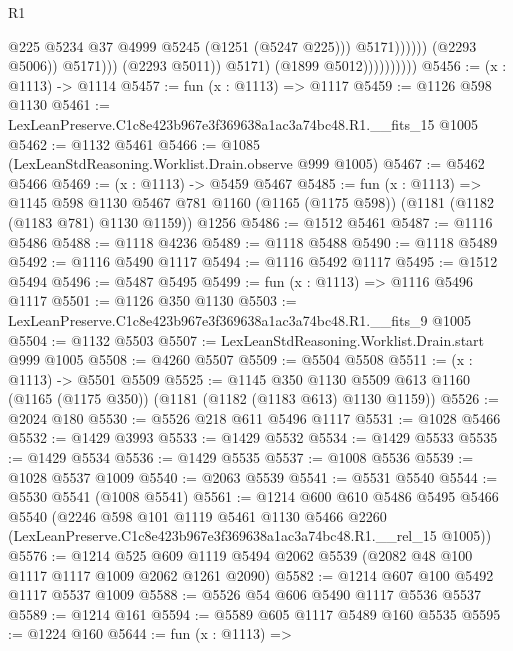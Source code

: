 \begin{lexlean}{R1}
\begin{coremodule}
                                                @225
                                                @5234
                                                @37
                                                @4999
                                                @5245
                                                (@1251 (@5247 @225)))
                                              @5171))))))
                                  (@2293 @5006))
                                @5171)))
                          (@2293 @5011))
                        @5171)
                      (@1899 @5012))))))))))
@5456 := (x : @1113) -> @1114
@5457 := fun (x : @1113) => @1117
@5459 := @1126 @598 @1130
@5461 := LexLeanPreserve.C1c8e423b967e3f369638a1ac3a74bc48.R1.__fits_15 @1005
@5462 := @1132 @5461
@5466 := @1085 (LexLeanStdReasoning.Worklist.Drain.observe @999 @1005)
@5467 := @5462 @5466
@5469 := (x : @1113) -> @5459 @5467
@5485 := fun (x : @1113) =>
  @1145
    @598
    @1130
    @5467
    @781
    @1160
    (@1165 (@1175 @598))
    (@1181 (@1182 (@1183 @781) @1130 @1159))
    @1256
@5486 := @1512 @5461
@5487 := @1116 @5486
@5488 := @1118 @4236
@5489 := @1118 @5488
@5490 := @1118 @5489
@5492 := @1116 @5490 @1117
@5494 := @1116 @5492 @1117
@5495 := @1512 @5494
@5496 := @5487 @5495
@5499 := fun (x : @1113) => @1116 @5496 @1117
@5501 := @1126 @350 @1130
@5503 := LexLeanPreserve.C1c8e423b967e3f369638a1ac3a74bc48.R1.__fits_9 @1005
@5504 := @1132 @5503
@5507 := LexLeanStdReasoning.Worklist.Drain.start @999 @1005
@5508 := @4260 @5507
@5509 := @5504 @5508
@5511 := (x : @1113) -> @5501 @5509
@5525 := @1145
    @350
    @1130
    @5509
    @613
    @1160
    (@1165 (@1175 @350))
    (@1181 (@1182 (@1183 @613) @1130 @1159))
@5526 := @2024 @180
@5530 := @5526 @218 @611 @5496 @1117
@5531 := @1028 @5466
@5532 := @1429 @3993
@5533 := @1429 @5532
@5534 := @1429 @5533
@5535 := @1429 @5534
@5536 := @1429 @5535
@5537 := @1008 @5536
@5539 := @1028 @5537 @1009
@5540 := @2063 @5539
@5541 := @5531 @5540
@5544 := @5530 @5541 (@1008 @5541)
@5561 := @1214
    @600
    @610
    @5486
    @5495
    @5466
    @5540
    (@2246
      @598
      @101
      @1119
      @5461
      @1130
      @5466
      @2260
      (LexLeanPreserve.C1c8e423b967e3f369638a1ac3a74bc48.R1.__rel_15 @1005))
@5576 := @1214
    @525
    @609
    @1119
    @5494
    @2062
    @5539
    (@2082 @48 @100 @1117 @1117 @1009 @2062 @1261 @2090)
@5582 := @1214 @607 @100 @5492 @1117 @5537 @1009
@5588 := @5526 @54 @606 @5490 @1117 @5536 @5537
@5589 := @1214 @161
@5594 := @5589 @605 @1117 @5489 @160 @5535
@5595 := @1224 @160
@5644 := fun (x : @1113) =>

\end{coremodule}
\end{lexlean}
